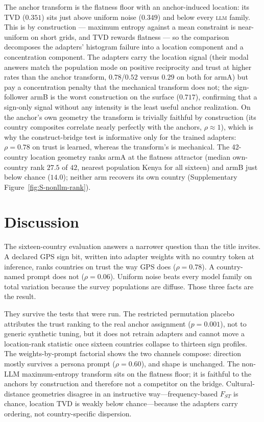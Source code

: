 \documentclass[10pt,letterpaper]{article}
\newcommand{\LLM}{\textsc{llm}}
\begin{document}
The anchor transform is the flatness floor with an anchor-induced location: its TVD ($0.351$) sits just above uniform noise ($0.349$) and below every \LLM{} family. This is by construction --- maximum entropy against a mean constraint is near-uniform on short grids, and TVD rewards flatness --- so the comparison decomposes the adapters' histogram failure into a location component and a concentration component. The adapters carry the location signal (their modal answers match the population mode on positive reciprocity and trust at higher rates than the anchor transform, $0.78$/$0.52$ versus $0.29$ on both for armA) but pay a concentration penalty that the mechanical transform does not; the sign-follower armB is the worst construction on the surface ($0.717$), confirming that a sign-only signal without any intensity is the least useful anchor realization. On the anchor's own geometry the transform is trivially faithful by construction (its country composites correlate nearly perfectly with the anchors, $\rho\approx 1$), which is why the construct-bridge test is informative only for the trained adapters: $\rho=0.78$ on trust is learned, whereas the transform's is mechanical. The 42-country location geometry ranks armA at the flatness attractor (median own-country rank $27.5$ of $42$, nearest population Kenya for all sixteen) and armB just below chance ($14.0$); neither arm recovers its own country (Supplementary Figure~\ref{fig:S-nonllm-rank}).

\section{Discussion}
The sixteen-country evaluation answers a narrower question than the title invites. A declared GPS sign bit, written into adapter weights with no country token at inference, ranks countries on trust the way GPS does ($\rho=0.78$). A country-named prompt does not ($\rho=0.06$). Uniform noise beats every model family on total variation because the survey populations are diffuse. Those three facts are the result.

They survive the tests that were run. The restricted permutation placebo attributes the trust ranking to the real anchor assignment ($p=0.001$), not to generic synthetic tuning, but it does not retrain adapters and cannot move a location-rank statistic once sixteen countries collapse to thirteen sign profiles. The weights-by-prompt factorial shows the two channels compose: direction mostly survives a persona prompt ($\rho=0.60$), and shape is unchanged. The non-LLM maximum-entropy transform sits on the flatness floor; it is faithful to the anchors by construction and therefore not a competitor on the bridge. Cultural-distance geometries disagree in an instructive way---frequency-based $F_{ST}$ is chance, location TVD is weakly below chance---because the adapters carry ordering, not country-specific dispersion.
\end{document}
